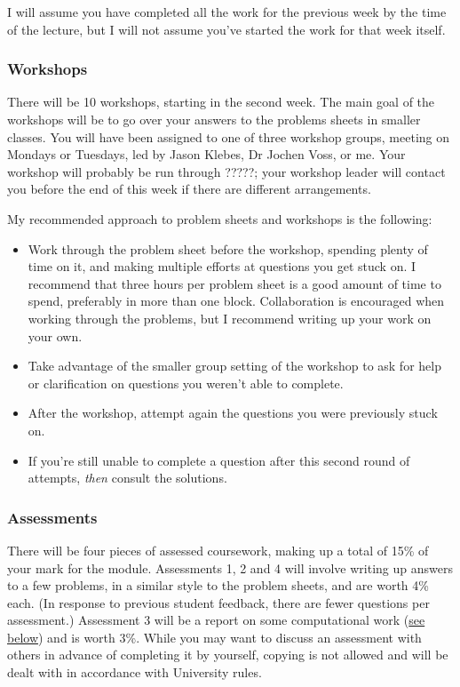 \documentclass[
  a4paper,
]{article}
\providecommand{\tightlist}{%
  \setlength{\itemsep}{0pt}\setlength{\parskip}{0pt}}
\theoremstyle{definition}
\theoremstyle{definition}
\theoremstyle{definition}
\theoremstyle{remark}
\begin{document}
I will assume you have completed all the work for the previous week by the time of the lecture, but I will not assume you've started the work for that week itself.

\hypertarget{workshops}{%
\subsubsection*{Workshops}\label{workshops}}

There will be 10 workshops, starting in the second week. The main goal of the workshops will be to go over your answers to the problems sheets in smaller classes. You will have been assigned to one of three workshop groups, meeting on Mondays or Tuesdays, led by Jason Klebes, Dr Jochen Voss, or me. Your workshop will probably be run through ?????; your workshop leader will contact you before the end of this week if there are different arrangements.

My recommended approach to problem sheets and workshops is the following:

\begin{itemize}
\tightlist
\item
  Work through the problem sheet before the workshop, spending plenty of time on it, and making multiple efforts at questions you get stuck on. I recommend that three hours per problem sheet is a good amount of time to spend, preferably in more than one block. Collaboration is encouraged when working through the problems, but I recommend writing up your work on your own.
\item
  Take advantage of the smaller group setting of the workshop to ask for help or clarification on questions you weren't able to complete.
\item
  After the workshop, attempt again the questions you were previously stuck on.
\item
  If you're still unable to complete a question after this second round of attempts, \emph{then} consult the solutions.
\end{itemize}

\hypertarget{assessments}{%
\subsubsection*{Assessments}\label{assessments}}

There will be four pieces of assessed coursework, making up a total of 15\% of your mark for the module. Assessments 1, 2 and 4 will involve writing up answers to a few problems, in a similar style to the problem sheets, and are worth 4\% each. (In response to previous student feedback, there are fewer questions per assessment.) Assessment 3 will be a report on some computational work (\protect\hyperlink{about--computing}{see below}) and is worth 3\%. While you may want to discuss an assessment with others in advance of completing it by yourself, copying is not allowed and will be dealt with in accordance with University rules.
\end{document}
